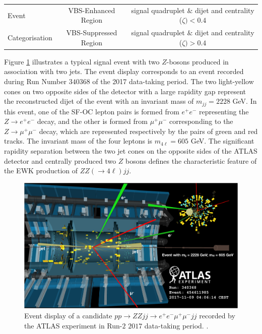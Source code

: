 \begin{table}[!htbp]
\begin{tabular}{|| l || c | c ||}
        Event               & VBS-Enhanced Region       & signal quadruplet $\&$ dijet and centrality ($\zeta) < 0.4 $              \\
        Categorisation          & VBS-Suppressed Region     & signal quadruplet $\&$ dijet and centrality ($\zeta) > 0.4$               \\
        
        \hline
    \end{tabular}
\end{table}

Figure \ref{fig:EventDisplayZZjj} illustrates a typical signal event with two $Z$-bosons produced in association with two jets. The event display corresponds to an event recorded during Run Number $340368$ of the 2017 data-taking period. The two light-yellow cones on two opposite sides of the detector with a large rapidity gap represent the reconstructed dijet of the event with an invariant mass of $m_{jj} = 2228$ GeV. In this event, one of the SF-OC lepton pairs is formed from $e^+e^-$ representing the $Z\rightarrow e^+e^-$ decay, and the other is formed from $\mu^+\mu^-$ corresponding to the $Z\rightarrow \mu^+\mu^-$ decay, which are represented respectively by the pairs of green and red tracks. The invariant mass of the four leptons is $m_{4\ell} = 605$ GeV. The significant rapidity separation between the two jet cones on the opposite sides of the ATLAS detector and centrally produced two $Z$ bosons defines the characteristic feature of the EWK production of $ZZ(\rightarrow 4\ell) jj$. 

\begin{figure}[!htbp]
\centering
\includegraphics[width=.9\linewidth]{figures/AnalysisOverview/ZZjjEventDisplay.png}  
\caption{Event display of a candidate $pp \rightarrow ZZjj \rightarrow e^+e^-\mu^+\mu^- jj $ recorded by the ATLAS experiment in Run-$2$ $2017$ data-taking period. \label{fig:EventDisplayZZjj} \cite{ATLASZZjj}.}
\end{figure}